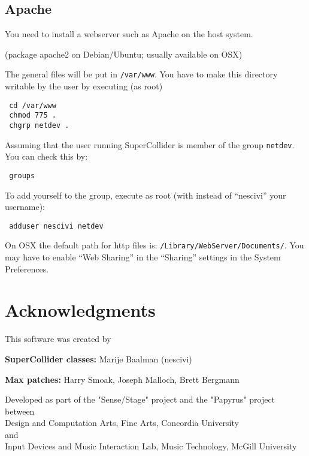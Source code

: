 \documentclass[letterpaper,10pt]{article}
\begin{document}
\subsection{Apache}

You need to install a webserver such as Apache on the host system.

(package apache2 on Debian/Ubuntu; usually available on OSX)

The general files will be put in \verb|/var/www|.
You have to make this directory writable by the user by executing (as root)

\begin{verbatim}
 cd /var/www
 chmod 775 .
 chgrp netdev .
\end{verbatim}

Assuming that the user running SuperCollider is member of the group \verb|netdev|. You can check this by:

\begin{verbatim}
 groups
\end{verbatim}

To add yourself to the group, execute as root (with instead of ``nescivi'' your username):
\begin{verbatim}
 adduser nescivi netdev
\end{verbatim}

On OSX the default path for http files is: \verb|/Library/WebServer/Documents/|. You may have to enable ``Web Sharing'' in the ``Sharing'' settings in the System Preferences.



\section*{Acknowledgments}\label{sec:acknowledgments}
This software was created by

\textbf{SuperCollider classes:}
Marije Baalman (nescivi)  

\textbf{Max patches:}
Harry Smoak, 
Joseph Malloch, 
Brett Bergmann


Developed as part of the "Sense/Stage" project and the "Papyrus" project between\\
Design and Computation Arts, Fine Arts, Concordia University\\
and\\
Input Devices and Music Interaction Lab, Music Technology, McGill University
\end{document}
